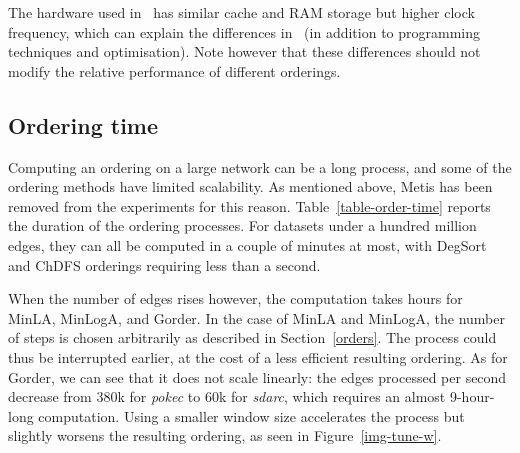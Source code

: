 The hardware used in~\cite{gorder} has similar cache and RAM storage but higher clock frequency, which can explain the differences in \runtime\ (in addition to programming techniques and optimisation). Note however that these differences should not modify the relative performance of different orderings.

\subsection{Ordering time}
Computing an ordering on a large network can be a long process, and some of the ordering methods have limited scalability. As mentioned above, Metis has been removed from the experiments for this reason.
%
Table~\ref{table-order-time} reports the duration of the ordering processes. For datasets under a hundred million edges, they can all be computed in a couple of minutes at most, with DegSort and ChDFS orderings requiring less than a second.


When the number of edges rises however, the computation takes hours for MinLA, MinLogA, and Gorder. In the case of MinLA and MinLogA, the number of steps is chosen arbitrarily as described in Section~\ref{orders}. The process could thus be interrupted earlier, at the cost of a less efficient resulting ordering.
%
As for Gorder, we can see that it does not scale linearly: the edges processed per second decrease from 380k for \textit{pokec} to 60k for \textit{sdarc}, which requires an almost 9-hour-long computation. Using a smaller window size accelerates the process but slightly worsens the resulting ordering, as seen in Figure~\ref{img-tune-w}.

